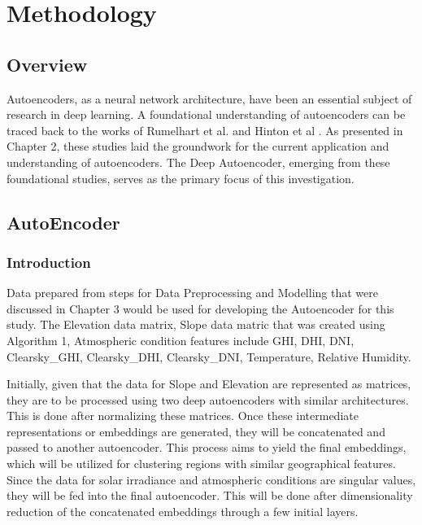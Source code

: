 \documentclass[a4paper,12pt]{Classes/RoboticsLaTeX}
\begin{document}
	\chapter{Methodology}

	\section{Overview}

	Autoencoders, as a neural network architecture, have been an essential subject of research in deep learning. 
	A foundational understanding of autoencoders can be traced back to the works of Rumelhart et al. and 
	Hinton et al \cite{rumelhart1986} \cite{Hinton2006}. As presented in Chapter 2, these studies laid the groundwork for the current application and 
	understanding of autoencoders. The Deep Autoencoder, emerging from these foundational studies, serves as the primary focus of this investigation.

	\section{AutoEncoder}

	\subsection{Introduction}

	Data prepared from steps for Data Preprocessing and Modelling that were discussed in Chapter 3 would be
	used for developing the Autoencoder for this study. The Elevation data matrix, Slope data matric that was created 
	using Algorithm 1, Atmospheric condition features include \ac{GHI}, \ac{DHI}, \ac{DNI}, Clearsky\_GHI, Clearsky\_DHI, 
	Clearsky\_DNI, Temperature, Relative Humidity. 

	Initially, given that the data for Slope and Elevation are represented as matrices, they are to be processed using two 
	deep autoencoders with similar architectures. This is done after normalizing these matrices. Once these intermediate 
	representations or embeddings are generated, they will be concatenated and passed to another autoencoder. This process 
	aims to yield the final embeddings, which will be utilized for clustering regions with similar geographical 
	features. Since the data for solar irradiance and atmospheric conditions are singular values, they will be fed into the 
	final autoencoder. This will be done after dimensionality reduction of the concatenated embeddings through a few initial layers.
\end{document}
